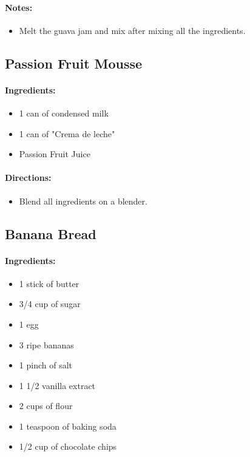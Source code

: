 \documentclass{article}
\begin{document}
\paragraph{Notes:}
\begin{itemize}
	\item Melt the guava jam and mix after mixing all the ingredients.
\end{itemize}

\subsection{Passion Fruit Mousse}
\paragraph{Ingredients:}
\begin{itemize}
	\item 1 can of condensed milk
	\item 1 can of "Crema de leche"
	\item Passion Fruit Juice
\end{itemize}

\paragraph{Directions:}
\begin{itemize}
	\item Blend all ingredients on a blender.
\end{itemize}

\subsection{Banana Bread}

\paragraph{Ingredients:}

\begin{itemize}
	\item 1 stick of butter
	\item 3/4 cup of sugar
	\item 1 egg
	\item 3 ripe bananas
	\item 1 pinch of salt
	\item 1 1/2 vanilla extract
	\item 2 cups of flour
	\item 1 teaspoon of baking soda
	\item 1/2 cup of chocolate chips
\end{itemize}
\end{document}
